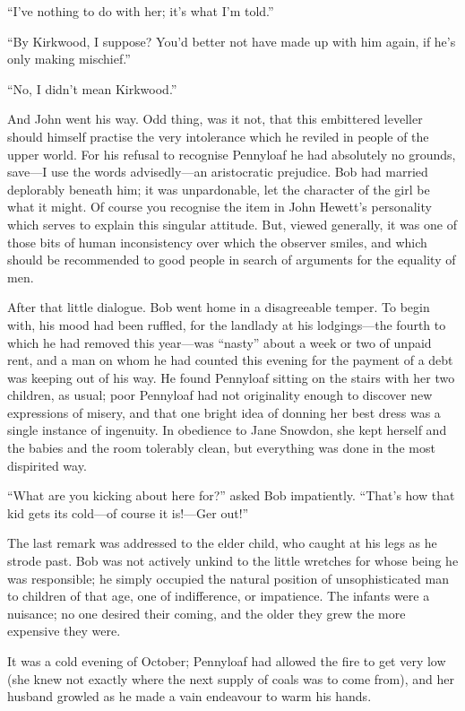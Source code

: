 ``I've nothing to do with her; it's what I'm told.''

``By Kirkwood, I suppose? You'd better not have made up with him again,
if he's only making mischief.''

``No, I didn't mean Kirkwood.''

And John went his way. Odd thing, was it not, that this embittered
leveller should himself practise the very intolerance which he reviled
in people of the upper world. For his refusal to recognise Pennyloaf he
had absolutely no grounds, save---I use the words advisedly---an
aristocratic prejudice. Bob had married deplorably beneath him; it was
unpardonable, let the character of the girl be what it might. Of course
you recognise the item in John Hewett's personality which serves to
explain this singular attitude. But, viewed
{\protect\hypertarget{221}{}{}}generally, it was one of those bits of
human inconsistency over which the observer smiles, and which should be
recommended to good people in search of arguments for the equality of
men.

After that little dialogue. Bob went home in a disagreeable temper. To
begin with, his mood had been ruffled, for the landlady at his
lodgings---the fourth to which he had removed this year---was ``nasty''
about a week or two of unpaid rent, and a man on whom he had counted
this evening for the payment of a debt was keeping out of his way. He
found Pennyloaf sitting on the stairs with her two children, as usual;
poor Pennyloaf had not originality enough to discover new expressions of
misery, and that one bright idea of donning her best dress was a single
instance of ingenuity. In obedience to Jane Snowdon, she kept herself
and the babies and the room tolerably clean, but everything was done in
the most dispirited way.

``What are you kicking about here for?'' asked Bob impatiently. ``That's
how that kid gets its cold---of course it is!---{Ger} out!''

{\protect\hypertarget{222}{}{}}The last remark was addressed to the
elder child, who caught at his legs as he strode past. Bob was not
actively unkind to the little wretches for whose being he was
responsible; he simply occupied the natural position of unsophisticated
man to children of that age, one of indifference, or impatience. The
infants were a nuisance; no one desired their coming, and the older they
grew the more expensive they were.

It was a cold evening of October; Pennyloaf had allowed the fire to get
very low (she knew not exactly where the next supply of coals was to
come from), and her husband growled as he made a vain endeavour to warm
his hands.

